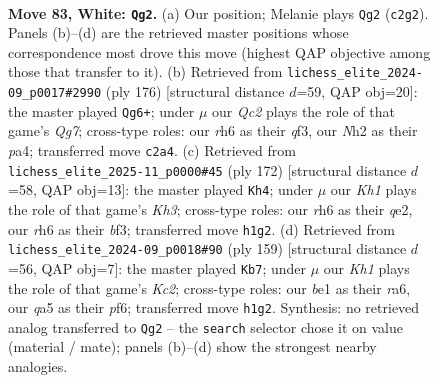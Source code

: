 \documentclass[11pt]{article}
\begin{document}
\begin{figure}[p]\centering
\begin{subfigure}{0.46\textwidth}\centering
\resizebox{\linewidth}{!}{%
\newchessgame
\chessboard[
  setfen={5r2/p2k2p1/7r/q6P/3P4/4P3/2Q4N/4b2K w - - 0 83},
  showmover=false,
  pgfstyle=straightmove, color=movearrow, markmove={c2-g2}
]}
\caption{}
\end{subfigure}\hfill
\begin{subfigure}{0.46\textwidth}\centering
\resizebox{\linewidth}{!}{%
\newchessgame
\chessboard[
  setfen={8/6Q1/1Pp1k3/7p/p6P/5qP1/8/6K1 w - - 0 89},
  showmover=false,
  pgfstyle=straightmove, color=movearrow, markmove={g7-g6}
]}
\caption{}
\end{subfigure}
\\[4pt]
\begin{subfigure}{0.46\textwidth}\centering
\resizebox{\linewidth}{!}{%
\newchessgame
\chessboard[
  setfen={4N1k1/1p1P4/6p1/8/4PQ2/5bPK/4q3/8 w - - 5 87},
  showmover=false,
  pgfstyle=straightmove, color=movearrow, markmove={h3-h4}
]}
\caption{}
\end{subfigure}\hfill
\begin{subfigure}{0.46\textwidth}\centering
\resizebox{\linewidth}{!}{%
\newchessgame
\chessboard[
  setfen={8/2k2p2/R4P2/5p2/1q6/4K3/p7/5Q2 b - - 3 80},
  showmover=false,
  pgfstyle=straightmove, color=movearrow, markmove={c7-b7}
]}
\caption{}
\end{subfigure}
\caption{\textbf{Move 83, White: \texttt{Qg2}.} (a) Our position; Melanie plays \texttt{Qg2} (\texttt{c2g2}). Panels (b)--(d) are the retrieved master positions whose correspondence most drove this move (highest QAP objective among those that transfer to it). (b) Retrieved from \texttt{lichess\_elite\_2024-09\_p0017\#2990} (ply 176) [structural distance $d$=59, QAP obj=20]: the master played \texttt{Qg6+}; under $\mu$ our \emph{Qc2} plays the role of that game's \emph{Qg7}; cross-type roles: our \emph{r}h6 as their \emph{q}f3, our \emph{N}h2 as their \emph{p}a4; transferred move \texttt{c2a4}. (c) Retrieved from \texttt{lichess\_elite\_2025-11\_p0000\#45} (ply 172) [structural distance $d$=58, QAP obj=13]: the master played \texttt{Kh4}; under $\mu$ our \emph{Kh1} plays the role of that game's \emph{Kh3}; cross-type roles: our \emph{r}h6 as their \emph{q}e2, our \emph{r}h6 as their \emph{b}f3; transferred move \texttt{h1g2}. (d) Retrieved from \texttt{lichess\_elite\_2024-09\_p0018\#90} (ply 159) [structural distance $d$=56, QAP obj=7]: the master played \texttt{Kb7}; under $\mu$ our \emph{Kh1} plays the role of that game's \emph{Kc2}; cross-type roles: our \emph{b}e1 as their \emph{r}a6, our \emph{q}a5 as their \emph{p}f6; transferred move \texttt{h1g2}. Synthesis: no retrieved analog transferred to \texttt{Qg2} -- the \texttt{search} selector chose it on value (material / mate); panels (b)--(d) show the strongest nearby analogies.}
\label{fig:thought-m164}
\end{figure}
\end{document}
